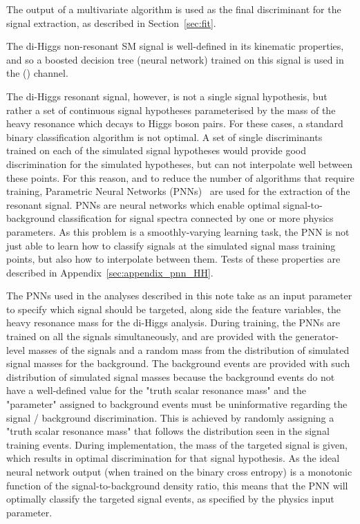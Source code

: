 The output of a multivariate algorithm is used as the final discriminant for the signal extraction, as described in Section~\ref{sec:fit}.

The di-Higgs non-resonant SM signal is well-defined in its kinematic properties, and so a boosted decision tree (neural network) trained on this signal is used in the \hadhad (\lephad) channel. 

The di-Higgs resonant signal, however, is not a single signal hypothesis, but rather a set of continuous signal hypotheses parameterised by the mass of the heavy resonance which decays to Higgs boson pairs. For these cases, a standard binary classification algorithm is not optimal. A set of single discriminants trained on each of the simulated signal hypotheses would provide good discrimination for the simulated hypotheses, but can not interpolate well between these points. For this reason, and to reduce the number of algorithms that require training, Parametric Neural Networks (PNNs)~\cite{Baldi:2016fzo} are used for the extraction of the resonant signal. PNNs are neural networks which enable optimal signal-to-background classification for signal spectra connected by one or more physics parameters. As this problem is a smoothly-varying learning task, the PNN is not just able to learn how to classify signals at the simulated signal mass training points, but also how to interpolate between them. Tests of these properties are described in Appendix~\ref{sec:appendix_pnn_HH}.

The PNNs used in the analyses described in this note take as an input parameter to specify which signal should be targeted, along side the feature variables, the heavy resonance mass for the di-Higgs analysis.
During training, the PNNs are trained on all the signals simultaneously, and are provided with the generator-level masses of the signals and a random mass from the distribution of simulated signal masses for the background. The background events are provided with such distribution of simulated signal masses because the background events do not have a well-defined value for the "truth scalar resonance mass" and the "parameter" assigned to background events must be uninformative regarding the signal / background discrimination. This is achieved by randomly assigning a "truth scalar resonance mass" that follows the distribution seen in the signal training events. During implementation, the mass of the targeted signal is given, which results in optimal discrimination for that signal hypothesis. As the ideal neural network output (when trained on the binary cross entropy) is a monotonic function of the signal-to-background density ratio, this means that the PNN will optimally classify the targeted signal events, as specified by the physics input parameter.

